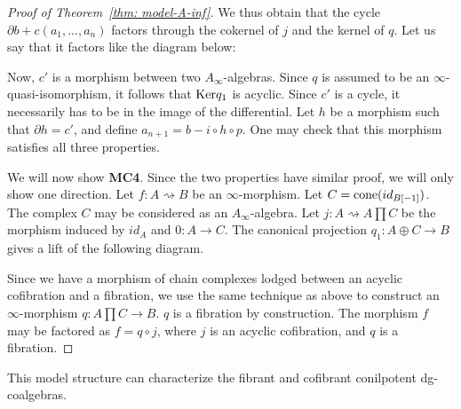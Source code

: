 \documentclass[../thesis.tex]{subfiles}
\begin{document}
\begin{proof}[Proof of Theorem~\ref{thm: model-A-inf}]
            We thus obtain that the cycle $\partial b + c(a_1, ..., a_n)$ factors through the cokernel of $j$ and the kernel of $q$. Let us say that it factors like the diagram below:
            \begin{center}
            \end{center}

            Now, $c'$ is a morphism between two $A_\infty$-algebras. Since $q$ is assumed to be an $\infty$-quasi-isomorphism, it follows that $\tt{Ker}q_1$ is acyclic. Since $c'$ is a cycle, it necessarily has to be in the image of the differential. Let $h$ be a morphism such that $\partial h = c'$, and define $a_{n+1} = b - i\circ h\circ p$. One may check that this morphism satisfies all three properties.

            We will now show \textbf{MC4}. Since the two properties have similar proof, we will only show one direction. Let $f: A \rightsquigarrow B$ be an $\infty$-morphism. Let $C = \tt{cone}(id_{B[-1]})$. The complex $C$ may be considered as an $A_\infty$-algebra. Let $j: A \rightsquigarrow A\prod C$ be the morphism induced by $id_A$ and $0:A \rightarrow C$. The canonical projection $q_1: A\oplus C \rightarrow B$ gives a lift of the following diagram.

            \begin{center}
            \end{center}

            Since we have a morphism of chain complexes lodged between an acyclic cofibration and a fibration, we use the same technique as above to construct an $\infty$-morphism $q: A\prod C \rightarrow B$. $q$ is a fibration by construction. The morphism $f$ may be factored as $f = q\circ j$, where $j$ is an acyclic cofibration, and $q$ is a fibration.
        \end{proof}

        This model structure can characterize the fibrant and cofibrant conilpotent dg-coalgebras.
\end{document}
